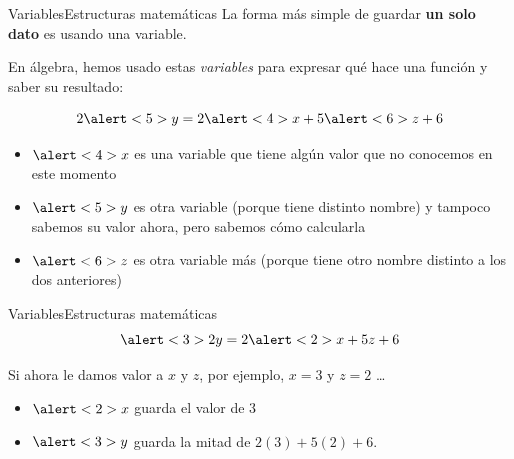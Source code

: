\documentclass[spanish, c]{beamer}
\begin{document}
\begin{frame}{Variables}{Estructuras matemáticas}
    La forma más simple de guardar \textbf{un solo dato} es usando una \alert{variable}. \pause

    En álgebra, hemos usado estas \textit{variables} para expresar qué hace una función y saber su resultado: \pause

    $$2\alert<5>{y} = 2\alert<4>{x} + 5\alert<6>{z} + 6$$ \pause

    \begin{itemize}
        \item $\alert<4>{x}$ es una variable que tiene algún valor que no conocemos en este momento
        \item $\alert<5>{y}$ es otra variable (porque tiene distinto nombre) y tampoco sabemos su valor ahora, pero sabemos cómo calcularla
        \item $\alert<6>{z}$ es otra variable más (porque tiene otro nombre distinto a los dos anteriores)
    \end{itemize}

\end{frame}

\begin{frame}[t]{Variables}{Estructuras matemáticas}    
    $$\alert<3>{2y} = 2\alert<2>{x} + 5{z} + 6$$

    \bigskip

    Si ahora le damos valor a $x$ y $z$, por ejemplo, $x = 3$ y $z = 2$ \dots \pause

    \bigskip

    \begin{itemize}
        \itemsep1.7ex
        \item $\alert<2>{x}$ guarda el valor de $3$
        \item $\alert<3>{y}$ guarda la mitad de $2(3) + 5(2) + 6$.
    \end{itemize}

\end{frame}
\end{document}
